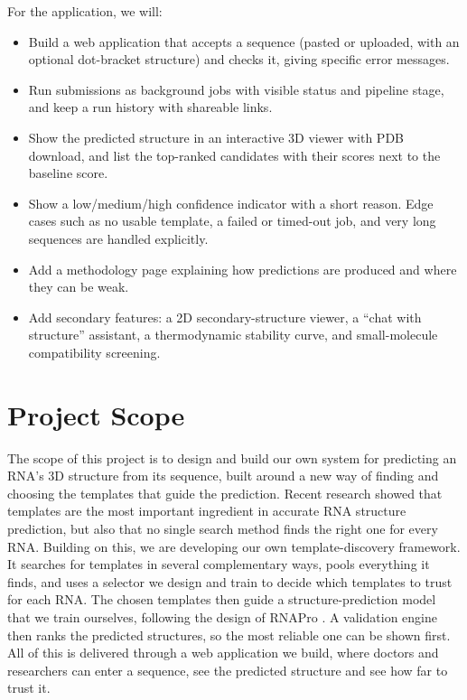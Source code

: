 \documentclass{FastFyp}
\begin{document}
For the application, we will:
\begin{itemize}
\item Build a web application that accepts a sequence (pasted or uploaded, with an optional dot-bracket structure) and checks it, giving specific error messages.
\item Run submissions as background jobs with visible status and pipeline stage, and keep a run history with shareable links.
\item Show the predicted structure in an interactive 3D viewer with PDB download, and list the top-ranked candidates with their scores next to the baseline score.
\item Show a low/medium/high confidence indicator with a short reason. Edge cases such as no usable template, a failed or timed-out job, and very long sequences are handled explicitly.
\item Add a methodology page explaining how predictions are produced and where they can be weak.
\item Add secondary features: a 2D secondary-structure viewer, a ``chat with structure'' assistant, a thermodynamic stability curve, and small-molecule compatibility screening.
\end{itemize}

\section{Project Scope}
\label{sec:scope}
The scope of this project is to design and build our own system for predicting an RNA's 3D structure from its sequence, built around a new way of finding and choosing the templates that guide the prediction. Recent research showed that templates are the most important ingredient in accurate RNA structure prediction, but also that no single search method finds the right one for every RNA. Building on this, we are developing our own template-discovery framework. It searches for templates in several complementary ways, pools everything it finds, and uses a selector we design and train to decide which templates to trust for each RNA. The chosen templates then guide a structure-prediction model that we train ourselves, following the design of RNAPro \cite{leerna}. A validation engine then ranks the predicted structures, so the most reliable one can be shown first. All of this is delivered through a web application we build, where doctors and researchers can enter a sequence, see the predicted structure and see how far to trust it.
\end{document}
